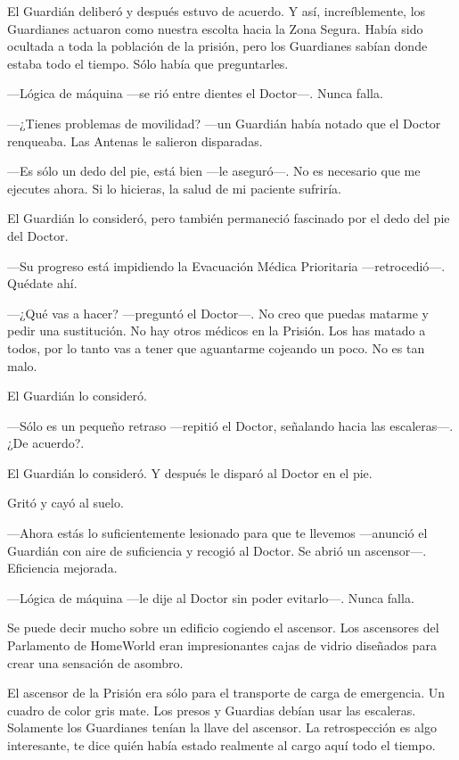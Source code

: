 El Guardián deliberó y después estuvo de acuerdo. Y así, increíblemente,
los Guardianes actuaron como nuestra escolta hacia la Zona Segura. Había
sido ocultada a toda la población de la prisión, pero los Guardianes
sabían donde estaba todo el tiempo. Sólo había que preguntarles.

---Lógica de máquina ---se rió entre dientes el Doctor---. Nunca falla.

---¿Tienes problemas de movilidad? ---un Guardián había notado que el
Doctor renqueaba. Las Antenas le salieron disparadas.

---Es sólo un dedo del pie, está bien ---le aseguró---. No es necesario
que me ejecutes ahora. Si lo hicieras, la salud de mi paciente sufriría.

El Guardián lo consideró, pero también permaneció fascinado por el dedo
del pie del Doctor.

---Su progreso está impidiendo la Evacuación Médica Prioritaria
---retrocedió---. Quédate ahí.

---¿Qué vas a hacer? ---preguntó el Doctor---. No creo que puedas
matarme y pedir una sustitución. No hay otros médicos en la Prisión. Los
has matado a todos, por lo tanto vas a tener que aguantarme cojeando un
poco. No es tan malo.

El Guardián lo consideró.

---Sólo es un pequeño retraso ---repitió el Doctor, señalando hacia las
escaleras---. ¿De acuerdo?.

El Guardián lo consideró. Y después le disparó al Doctor en el pie.

Gritó y cayó al suelo.

---Ahora estás lo suficientemente lesionado para que te llevemos
---anunció el Guardián con aire de suficiencia y recogió al Doctor. Se
abrió un ascensor---. Eficiencia mejorada.

---Lógica de máquina ---le dije al Doctor sin poder evitarlo---. Nunca
falla.

Se puede decir mucho sobre un edificio cogiendo el ascensor. Los
ascensores del Parlamento de HomeWorld eran impresionantes cajas de
vidrio diseñados para crear una sensación de asombro.

El ascensor de la Prisión era sólo para el transporte de carga de
emergencia. Un cuadro de color gris mate. Los presos y Guardias debían
usar las escaleras. Solamente los Guardianes tenían la llave del
ascensor. La retrospección es algo interesante, te dice quién había
estado realmente al cargo aquí todo el tiempo.

